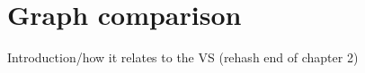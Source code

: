 \chapter{Graph comparison \label{ch:gc}}

Introduction/how it relates to the VS (rehash end of chapter 2)



